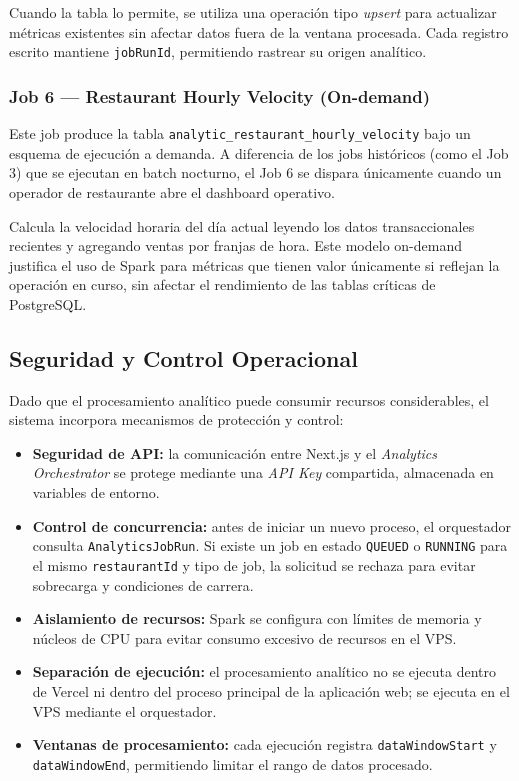 Cuando la tabla lo permite, se utiliza una operación tipo \textit{upsert} para actualizar
métricas existentes sin afectar datos fuera de la ventana procesada. Cada registro escrito
mantiene \texttt{jobRunId}, permitiendo rastrear su origen analítico.

\subsubsection{Job 6 --- Restaurant Hourly Velocity (On-demand)}

Este job produce la tabla \texttt{analytic\_restaurant\_hourly\_velocity} bajo un esquema de ejecución a demanda.
A diferencia de los jobs históricos (como el Job 3) que se ejecutan en batch nocturno, el Job 6 se dispara
únicamente cuando un operador de restaurante abre el dashboard operativo. 

Calcula la velocidad horaria del día actual leyendo los datos transaccionales recientes y agregando 
ventas por franjas de hora. Este modelo on-demand justifica el uso de Spark para métricas que 
tienen valor únicamente si reflejan la operación en curso, sin afectar el rendimiento de las tablas 
críticas de PostgreSQL.

\subsection{Seguridad y Control Operacional}

Dado que el procesamiento analítico puede consumir recursos considerables, el sistema
incorpora mecanismos de protección y control:

\begin{itemize}[leftmargin=1.5em]
  \item \textbf{Seguridad de API:} la comunicación entre Next.js y el
  \textit{Analytics Orchestrator} se protege mediante una \textit{API Key} compartida,
  almacenada en variables de entorno.

  \item \textbf{Control de concurrencia:} antes de iniciar un nuevo proceso, el
  orquestador consulta \texttt{AnalyticsJobRun}. Si existe un job en estado
  \texttt{QUEUED} o \texttt{RUNNING} para el mismo \texttt{restaurantId} y tipo de job,
  la solicitud se rechaza para evitar sobrecarga y condiciones de carrera.

  \item \textbf{Aislamiento de recursos:} Spark se configura con límites de memoria y
  núcleos de CPU para evitar consumo excesivo de recursos en el VPS.

  \item \textbf{Separación de ejecución:} el procesamiento analítico no se ejecuta dentro
  de Vercel ni dentro del proceso principal de la aplicación web; se ejecuta en el VPS
  mediante el orquestador.

  \item \textbf{Ventanas de procesamiento:} cada ejecución registra
  \texttt{dataWindowStart} y \texttt{dataWindowEnd}, permitiendo limitar el rango de datos
  procesado.
\end{itemize}

